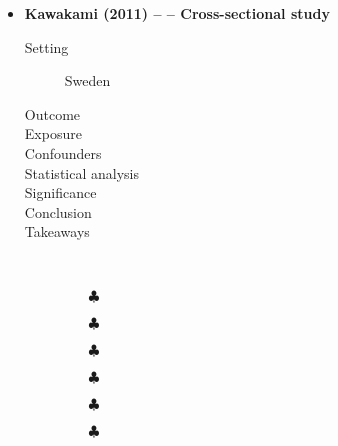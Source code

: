 \documentclass{article}
\begin{document}
\begin{itemize}
\newpage
		\item {\bf Kawakami (2011) -- -- Cross-sectional study}
				\begin{description}
						\item[Setting] Sweden 
						\item[Outcome]
						\item[Exposure]
						\item[Confounders]
						\item[Statistical analysis]
						\item[Significance] 
						\item[Conclusion]
    	         		\item[Takeaways] \mbox{}\\ 
    			        	\begin{itemize}
									\item[$\clubsuit$] 
									\item[$\clubsuit$] 
									\item[$\clubsuit$] 
									\item[$\clubsuit$] 
									\item[$\clubsuit$] 
									\item[$\clubsuit$] 
							\end{itemize}
			    \end{description}


\end{itemize}
\end{document}
